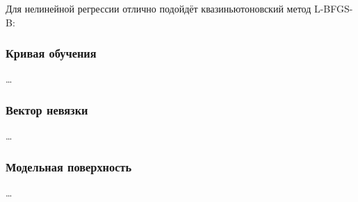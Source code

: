Для нелинейной регрессии отлично подойдёт квазиньютоновский метод L-BFGS-B:

\subsubsection{Кривая обучения}

\dots

\subsubsection{Вектор невязки}

\dots

\subsubsection{Модельная поверхность}

\dots